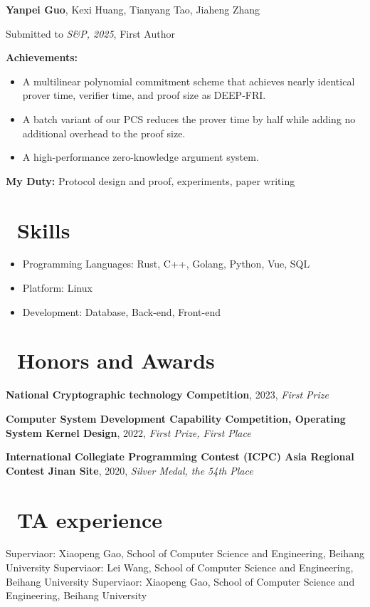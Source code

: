 \documentclass{resume}
\begin{document}
\textbf{Yanpei Guo}, Kexi Huang, Tianyang Tao, Jiaheng Zhang

Submitted to \textit{S\&P, 2025}, First Author

\textbf{Achievements:}
\begin{itemize}
  \item A multilinear polynomial commitment scheme that achieves nearly identical prover time, verifier time, and proof size as DEEP-FRI.
  \item A batch variant of our PCS reduces the prover time by half while adding no additional overhead to the proof size.
  \item A high-performance zero-knowledge argument system.
\end{itemize}
\textbf{My Duty:} Protocol design and proof, experiments, paper writing

\section{\faCogs\ Skills}
\begin{itemize}[parsep=0.5ex]
  \item Programming Languages: Rust, C++, Golang, Python, Vue, SQL
  \item Platform: Linux
  \item Development: Database, Back-end, Front-end
\end{itemize}

\section{\faCertificate\ Honors and Awards}
\textbf{National Cryptographic technology Competition}, 2023, \textit{First Prize}

\textbf{Computer System Development Capability Competition, Operating System Kernel Design}, 2022,  \textit{First Prize, First Place}

\textbf{International Collegiate Programming Contest (ICPC) Asia Regional Contest Jinan Site}, 2020, \textit{Silver Medal, the 54th Place}

\section{\faHeartO\ TA experience}
Superviaor: Xiaopeng Gao, School of Computer Science and Engineering, Beihang University
Superviaor: Lei Wang, School of Computer Science and Engineering, Beihang University
Superviaor: Xiaopeng Gao, School of Computer Science and Engineering, Beihang University

%
%
\end{document}
